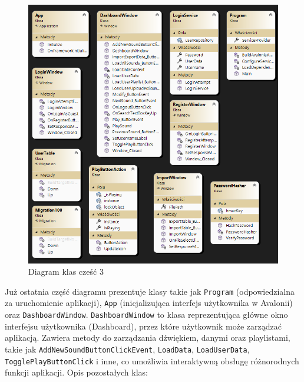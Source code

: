 \begin{figure}[!ht]
	\begin{center}
	\includegraphics[width=500pt]{figures/diagram_czesc4.png}
        \caption{{\footnotesize Diagram klas cześć 3}}
	\end{center}
\end{figure}

\newpage

{Już ostatnia część diagramu prezentuje klasy takie jak \texttt{Program} (odpowiedzialna za uruchomienie aplikacji), \texttt{App} (inicjalizująca interfejs użytkownika w Avalonii) oraz \texttt{DashboardWindow}. \texttt{DashboardWindow} to klasa reprezentująca główne okno interfejsu użytkownika (Dashboard), przez które użytkownik może zarządzać aplikacją. Zawiera metody do zarządzania dźwiękiem, danymi oraz playlistami, takie jak \texttt{AddNewSoundButtonClickEvent}, \texttt{LoadData}, \texttt{LoadUserData}, \newline \texttt{TogglePlayButtonClick} i inne, co umożliwia interaktywną obsługę różnorodnych funkcji aplikacji. Opis pozostałych klas:}

